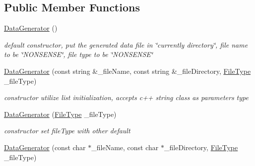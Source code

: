 \subsection*{\-Public \-Member \-Functions}
\begin{DoxyCompactItemize}
\item 
\hypertarget{classDataGenerator_a1b096a6b707523c5561a7961b5d635b1}{\hyperlink{classDataGenerator_a1b096a6b707523c5561a7961b5d635b1}{\-Data\-Generator} ()}\label{classDataGenerator_a1b096a6b707523c5561a7961b5d635b1}

\begin{DoxyCompactList}\small\item\em default constructor, put the generated data file in \char`\"{}currently directory\char`\"{}, file name to be \char`\"{}\-N\-O\-N\-S\-E\-N\-S\-E\char`\"{}, file type to be \char`\"{}\-N\-O\-N\-S\-E\-N\-S\-E\char`\"{} \end{DoxyCompactList}\item 
\hypertarget{classDataGenerator_a91666b97997fbb3ebfd5bd5da47ab07d}{\hyperlink{classDataGenerator_a91666b97997fbb3ebfd5bd5da47ab07d}{\-Data\-Generator} (const string \&\-\_\-file\-Name, const string \&\-\_\-file\-Directory, \hyperlink{FileType_8h_a2c794c5c13ab4dd7e65bad031dbe41c3}{\-File\-Type} \-\_\-file\-Type)}\label{classDataGenerator_a91666b97997fbb3ebfd5bd5da47ab07d}

\begin{DoxyCompactList}\small\item\em constructor utilize list initialization, accepts c++ string class as parameters type \end{DoxyCompactList}\item 
\hypertarget{classDataGenerator_a32248aac87220f988e50cf1aaee979f7}{\hyperlink{classDataGenerator_a32248aac87220f988e50cf1aaee979f7}{\-Data\-Generator} (\hyperlink{FileType_8h_a2c794c5c13ab4dd7e65bad031dbe41c3}{\-File\-Type} \-\_\-file\-Type)}\label{classDataGenerator_a32248aac87220f988e50cf1aaee979f7}

\begin{DoxyCompactList}\small\item\em constructor set file\-Type with other default \end{DoxyCompactList}\item 
\hypertarget{classDataGenerator_a7e007f23a4bc18126117a44a7f0982a7}{\hyperlink{classDataGenerator_a7e007f23a4bc18126117a44a7f0982a7}{\-Data\-Generator} (const char $\ast$\-\_\-file\-Name, const char $\ast$\-\_\-file\-Directory, \hyperlink{FileType_8h_a2c794c5c13ab4dd7e65bad031dbe41c3}{\-File\-Type} \-\_\-file\-Type)}\label{classDataGenerator_a7e007f23a4bc18126117a44a7f0982a7}


\end{DoxyCompactItemize}
